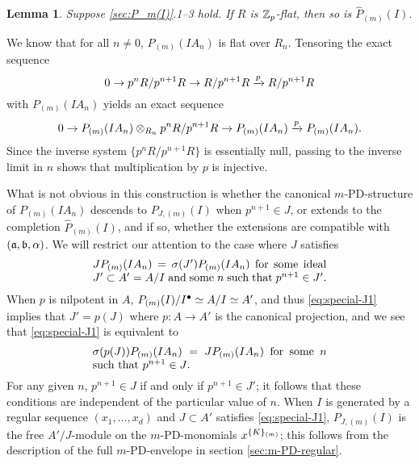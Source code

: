 \documentclass{article}
\theoremstyle{change}
\newtheorem{lemma}[subsubsection]{Lemma}
\numberwithin{equation}{subsubsection}
\newcommand{\demobox}{\vrule height6pt width6pt depth0pt}
\newenvironment{demo}{\noindent{\it Proof.}}
{{\unskip\nobreak\hfil\qquad
\demobox\parfillskip=0pt\par}
\medskip}
\begin{document}
\begin{lemma}\label{lemma:flatness-of-hatP}
  Suppose \ref{sec:P_m(I)}.1--3 hold.  If $R$ is ${\mathbb Z}_p$-flat, then so
  is $\hat P_{(m)}(I)$.
\end{lemma}
\begin{demo}
  We know that for all $n\ne0$, $P_{(m)}(IA_n)$ is flat over
  $R_n$. Tensoring the exact sequence
  \begin{displaymath}
    0\to p^nR/p^{n+1}R\to R/p^{n+1}R\xrightarrow{p} R/p^{n+1}R
  \end{displaymath}
  with $P_{(m)}(IA_n)$ yields an exact sequence
  \begin{displaymath}
    0\to P_{(m)}(IA_n)\otimes_{R_n}p^nR/p^{n+1}R
    \to P_{(m)}(IA_n)\xrightarrow{p}P_{(m)}(IA_n).
  \end{displaymath}
  Since the inverse system $\{p^nR/p^{n+1}R\}$ is essentially null,
  passing to the inverse limit in $n$ shows that multiplication by $p$
  is injective.
\end{demo}

What is not obvious in this construction is whether the canonical
$m$-PD-structure of $P_{(m)}(IA_n)$ descends to $P_{J,(m)}(I)$ when
$p^{n+1}\in J$, or extends to the completion $\hat P_{(m)}(I)$, and if
so, whether the extensions are compatible with $({\mathfrak a},{\mathfrak b},\alpha)$. We
will restrict our attention to the case where $J$ satisfies
\begin{equation}
  \label{eq:special-J1}
  \begin{minipage}{0.6\linewidth}
    $JP_{(m)}(IA_n)=\sigma(J')P_{(m)}(IA_n)$ for some ideal $J'\subset
    A'=A/I$ and some $n$ such that $p^{n+1}\in J'$.
  \end{minipage}
\end{equation}
When $p$ is nilpotent in $A$, $P_{(m)}(I)/I^\bullet\simeq A/I\simeq A'$,
and thus \ref{eq:special-J1} implies that $J'=p(J)$ where $p:A\to A'$
is the canonical projection, and we see that \ref{eq:special-J1} is
equivalent to
\begin{equation}
  \label{eq:special-J2}
  \begin{minipage}{0.6\linewidth}
    $\sigma(p(J))P_{(m)}(IA_n)=JP_{(m)}(IA_n)$
    for some $n$ such that $p^{n+1}\in J$.
  \end{minipage}
\end{equation}
For any given $n$, $p^{n+1}\in J$ if and only if $p^{n+1}\in J'$; it follows
that these conditions are independent of the particular value of $n$.
When $I$ is generated by a regular sequence $(x_1,\ldots,x_d)$ and
$J\subset A'$ satisfies \ref{eq:special-J1}, $P_{J,(m)}(I)$ is the
free $A'/J$-module on the $m$-PD-monomials ${x}^{\{{K}\}_{(m)}}$; this
follows from the description of the full $m$-PD-envelope in section
\ref{sec:m-PD-regular}. 
\end{document}
